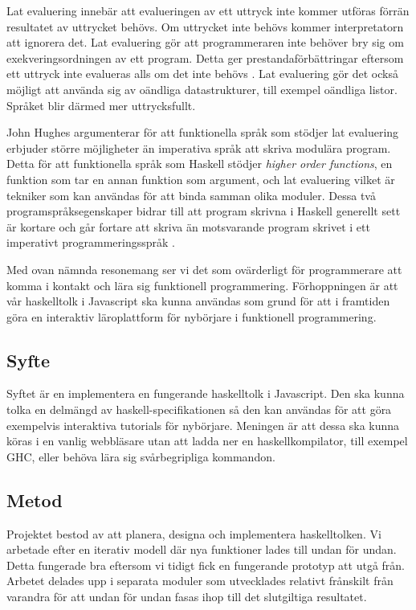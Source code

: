 Lat evaluering innebär att evalueringen av ett uttryck inte kommer utföras förrän resultatet av uttrycket behövs. Om uttrycket inte behövs  kommer interpretatorn att ignorera det. 
Lat evaluering gör att programmeraren inte behöver bry sig om exekveringsordningen av ett program. Detta ger prestandaförbättringar eftersom ett uttryck inte evalueras alls om det inte behövs \citep{hudak89}.
Lat evaluering gör det också möjligt att använda sig av oändliga datastrukturer, till exempel oändliga listor. Språket blir därmed mer uttrycksfullt. 

John Hughes argumenterar för att  funktionella språk som stödjer lat evaluering erbjuder större möjligheter än imperativa språk att skriva modulära program. Detta för att funktionella språk som Haskell stödjer \emph{higher order functions}, en funktion som tar en annan funktion som argument, och lat evaluering vilket är tekniker som kan användas för att binda samman olika moduler.
Dessa två programspråksegenskaper bidrar till att program skrivna i Haskell generellt sett är kortare och går fortare att skriva än motsvarande program skrivet i ett imperativt programmeringsspråk \citep{why}.

Med ovan nämnda resonemang ser vi det som ovärderligt för programmerare att komma i kontakt och lära sig funktionell programmering. 
Förhoppningen är att vår haskelltolk i Javascript ska kunna användas som grund för att i framtiden göra en interaktiv läroplattform för nybörjare i funktionell programmering. 


\subsection{Syfte}
Syftet är en implementera en fungerande haskelltolk i Javascript. Den ska kunna tolka en delmängd av haskell-specifikationen så den kan användas för att göra exempelvis interaktiva tutorials för nybörjare.
Meningen är att dessa ska kunna köras i en vanlig webbläsare utan att ladda ner en haskellkompilator, till exempel GHC, eller behöva lära sig svårbegripliga kommandon.

\subsection{Metod}
Projektet bestod av att planera, designa och implementera haskelltolken. Vi arbetade efter en iterativ modell där nya funktioner lades till undan för undan. Detta fungerade bra eftersom vi tidigt fick en fungerande prototyp att utgå från. Arbetet delades upp i separata moduler som utvecklades relativt frånskilt från varandra för att undan för undan fasas ihop till det slutgiltiga resultatet. 

